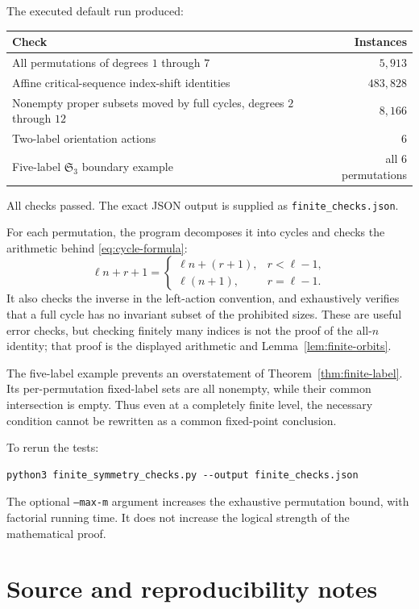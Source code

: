 \documentclass[11pt,letterpaper]{article}
\theoremstyle{definition}
\newcommand{\Sym}{\mathfrak S}
\begin{document}
The executed default run produced:
\begin{center}
\renewcommand{\arraystretch}{1.13}
\begin{tabularx}{\textwidth}{@{}Yr@{}}
\toprule
\textbf{Check}&\textbf{Instances}\\\midrule
All permutations of degrees $1$ through $7$ & $5{,}913$\\
Affine critical-sequence index-shift identities & $483{,}828$\\
Nonempty proper subsets moved by full cycles, degrees $2$ through $12$ & $8{,}166$\\
Two-label orientation actions & $6$\\
Five-label $\Sym_3$ boundary example & all $6$ permutations\\
\bottomrule
\end{tabularx}
\end{center}
All checks passed. The exact JSON output is supplied as \nolinkurl{finite_checks.json}.

For each permutation, the program decomposes it into cycles and checks the arithmetic behind \eqref{eq:cycle-formula}:
\[
 \ell n+r+1=
 \begin{cases}
  \ell n+(r+1),&r<\ell-1,\\
  \ell(n+1),&r=\ell-1.
 \end{cases}
\]
It also checks the inverse in the left-action convention, and exhaustively verifies that a full cycle has no invariant subset of the prohibited sizes. These are useful error checks, but checking finitely many indices is not the proof of the all-$n$ identity; that proof is the displayed arithmetic and Lemma~\ref{lem:finite-orbits}.

The five-label example prevents an overstatement of Theorem~\ref{thm:finite-label}. Its per-permutation fixed-label sets are all nonempty, while their common intersection is empty. Thus even at a completely finite level, the necessary condition cannot be rewritten as a common fixed-point conclusion.

To rerun the tests:
\begin{verbatim}
python3 finite_symmetry_checks.py --output finite_checks.json
\end{verbatim}
The optional \texttt{--max-m} argument increases the exhaustive permutation bound, with factorial running time. It does not increase the logical strength of the mathematical proof.

\section{Source and reproducibility notes}\label{app:sources}
\end{document}
